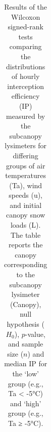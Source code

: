 \documentclass[
  letterpaper,
  DIV=11,
  numbers=noendperiod]{scrartcl}
\begin{document}
\begin{longtable}[]{@{}
  >{\raggedright\arraybackslash}p{}
  >{\raggedright\arraybackslash}p{}
  >{\raggedright\arraybackslash}p{}
  >{\raggedright\arraybackslash}p{}
  >{\raggedright\arraybackslash}p{}
  >{\raggedright\arraybackslash}p{}@{}}

\caption{\label{tbl-scl-hrly-stats}Results of the Wilcoxon signed-rank
tests comparing the distributions of hourly interception efficiency (IP)
measured by the subcanopy lysimeters for differing groups of air
temperatures (Ta), wind speeds (u), and initial canopy snow loads (L).
The table reports the canopy corresponding to the subcanopy lysimeter
(Canopy), null hypothesis (\(H_0\)), \(p\)-value, and sample size
(\(n\)) and median IP for the `low' group (e.g., Ta \textless{} -5°C)
and `high' group (e.g., Ta ≥ -5°C).}

\tabularnewline


\end{longtable}
\end{document}
